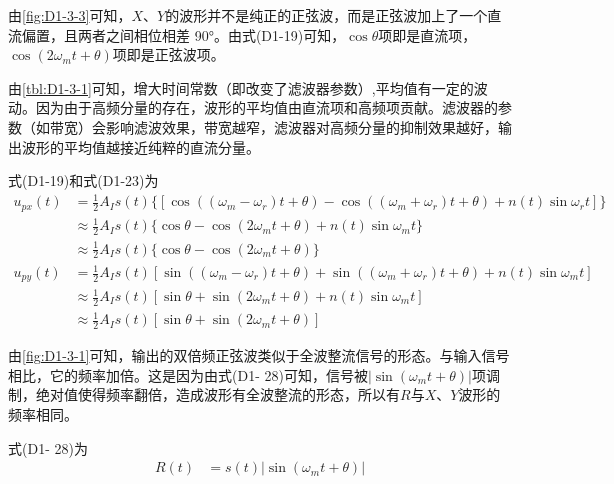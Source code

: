 \documentclass[dvipsnames, svgnames,a4paper,11pt]{article}
\begin{document}
		由\cref{fig:D1-3-3}可知，$X$、$Y$的波形并不是纯正的正弦波，而是正弦波加上了一个直流偏置，且两者之间相位相差 90°。由式(D1-19)可知，$\cos\theta$项即是直流项，$\cos(2\omega_m t + \theta)$项即是正弦波项。

		由\cref{tbl:D1-3-1}可知，增大时间常数（即改变了滤波器参数）,平均值有一定的波动。因为由于高频分量的存在，波形的平均值由直流项和高频项贡献。滤波器的参数（如带宽）会影响滤波效果，带宽越窄，滤波器对高频分量的抑制效果越好，输出波形的平均值越接近纯粹的直流分量。



		式(D1-19)和式(D1-23)为
		\begin{align*}
			u_{px}(t) &= \frac{1}{2} A_I s(t) \{ [ \cos((\omega_m - \omega_r)t + \theta) - \cos((\omega_m + \omega_r)t + \theta) + n(t)\sin\omega_r t ]\} \\
			&\approx \frac{1}{2} A_I s(t)\{ \cos\theta - \cos(2\omega_m t + \theta) + n(t)\sin\omega_m t\} \\
			&\approx \frac{1}{2} A_I s(t)\{ \cos\theta - \cos(2\omega_m t + \theta) \} \\
			u_{py}(t) &= \frac{1}{2} A_I s(t) [ \sin((\omega_m - \omega_r)t + \theta) + \sin((\omega_m + \omega_r)t + \theta) + n(t)\sin\omega_m t ] \\
			&\approx \frac{1}{2} A_I s(t) [ \sin\theta + \sin(2\omega_m t + \theta) + n(t)\sin\omega_m t ] \\
			&\approx \frac{1}{2} A_I s(t) [ \sin\theta + \sin(2\omega_m t + \theta) ]
		\end{align*}


		由\cref{fig:D1-3-1}可知，输出的双倍频正弦波类似于全波整流信号的形态。与输入信号相比，它的频率加倍。这是因为由式(D1- 28)可知，信号被$\left | \sin(\omega_m t + \theta) \right |$项调制，绝对值使得频率翻倍，造成波形有全波整流的形态，所以有$R$与$X$、$Y$波形的频率相同。

		式(D1- 28)为
		\begin{align*}
			R(t) &= s(t) \left | \sin(\omega_m t + \theta) \right | 
		\end{align*}

\end{document}
